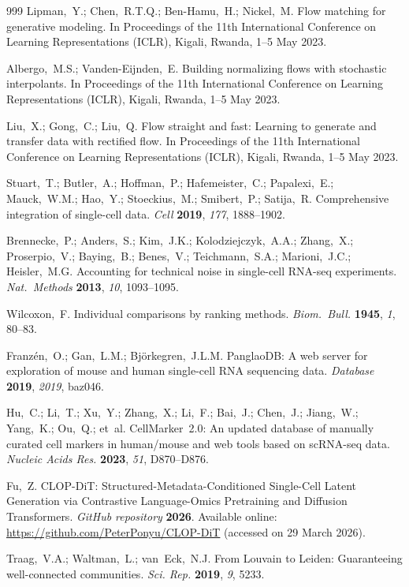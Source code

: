 \begin{thebibliography}{999}
Lipman,~Y.; Chen,~R.T.Q.; Ben-Hamu,~H.; Nickel,~M. Flow matching for generative modeling. In Proceedings of the 11th International Conference on Learning Representations (ICLR), Kigali, Rwanda, 1--5 May 2023.

Albergo,~M.S.; Vanden-Eijnden,~E. Building normalizing flows with stochastic interpolants. In Proceedings of the 11th International Conference on Learning Representations (ICLR), Kigali, Rwanda, 1--5 May 2023.

Liu,~X.; Gong,~C.; Liu,~Q. Flow straight and fast: Learning to generate and transfer data with rectified flow. In Proceedings of the 11th International Conference on Learning Representations (ICLR), Kigali, Rwanda, 1--5 May 2023.

Stuart,~T.; Butler,~A.; Hoffman,~P.; Hafemeister,~C.; Papalexi,~E.; Mauck,~W.M.; Hao,~Y.; Stoeckius,~M.; Smibert,~P.; Satija,~R. Comprehensive integration of single-cell data. {\em Cell} {\bf 2019}, {\em 177}, 1888--1902.

Brennecke,~P.; Anders,~S.; Kim,~J.K.; Kolodziejczyk,~A.A.; Zhang,~X.; Proserpio,~V.; Baying,~B.; Benes,~V.; Teichmann,~S.A.; Marioni,~J.C.; Heisler,~M.G. Accounting for technical noise in single-cell RNA-seq experiments. {\em Nat.\ Methods} {\bf 2013}, {\em 10}, 1093--1095.

Wilcoxon,~F. Individual comparisons by ranking methods. {\em Biom.\ Bull.} {\bf 1945}, {\em 1}, 80--83.

Franz\'{e}n,~O.; Gan,~L.M.; Bj\"{o}rkegren,~J.L.M. PanglaoDB: A web server for exploration of mouse and human single-cell RNA sequencing data. {\em Database} {\bf 2019}, {\em 2019}, baz046.

Hu,~C.; Li,~T.; Xu,~Y.; Zhang,~X.; Li,~F.; Bai,~J.; Chen,~J.; Jiang,~W.; Yang,~K.; Ou,~Q.; et~al. CellMarker~2.0: An updated database of manually curated cell markers in human/mouse and web tools based on scRNA-seq data. {\em Nucleic Acids Res.} {\bf 2023}, {\em 51}, D870--D876.

Fu,~Z. CLOP-DiT: Structured-Metadata-Conditioned Single-Cell Latent Generation via Contrastive Language-Omics Pretraining and Diffusion Transformers. {\em GitHub repository} {\bf 2026}. Available online: \url{https://github.com/PeterPonyu/CLOP-DiT} (accessed on 29 March 2026).

Traag,~V.A.; Waltman,~L.; van~Eck,~N.J. From Louvain to Leiden: Guaranteeing well-connected communities. {\em Sci. Rep.} {\bf 2019}, {\em 9}, 5233.


\end{thebibliography}
